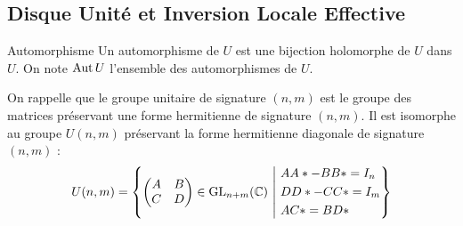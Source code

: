 \documentclass{cours}
\begin{document}
\subsection{Disque Unité et Inversion Locale Effective}
\begin{définition}{Automorphisme}{}
    Un automorphisme de $U$ est une bijection holomorphe de $U$ dans $U$. On note $\operatorname{Aut} U$ l'ensemble des automorphismes de $U$. 
\end{définition}

On rappelle que le groupe unitaire de signature $(n, m)$ est le groupe des matrices préservant une forme hermitienne de signature $(n, m)$. Il est isomorphe au groupe $U(n, m)$ préservant la forme hermitienne diagonale de signature $(n, m)$ : 
\[
    U(n, m) = \left\{\begin{pmatrix}
        A & B \\ C & D
    \end{pmatrix} \in {\rm GL}_{n + m}(\C) \ \middle| \ \begin{aligned}&AA* - BB* = I_{n}\\
    &DD* - CC* = I_{m}\\ &AC* = BD* \end{aligned} \right\} 
\]
\end{document}
